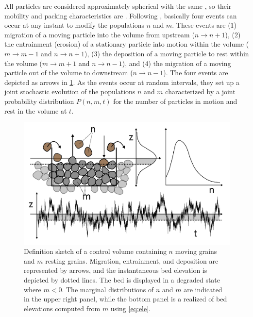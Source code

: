 All particles are considered approximately spherical with the same \DIFdelbegin {}\DIFdelend \DIFaddbegin {}\DIFaddend , so their mobility and packing characteristics are \DIFdelbegin {}\DIFdelend \DIFaddbegin {}\DIFaddend .
Following \citet{Ancey2008}, basically four events can occur at any instant to modify the populations $n$ and $m$.
These events are \DIFdelbegin {}\DIFdelend (1) migration of a moving particle into the volume from upstream ($n \rightarrow n+1$), (2) the entrainment (erosion) of a stationary particle into motion within the volume ($m\rightarrow m-1$ and $n\rightarrow n+1$), (3) the deposition of a moving particle to rest within the volume ($m\rightarrow m+1$ and $n\rightarrow n-1$), and (4) the migration of a moving particle out of the volume to downstream ($n\rightarrow n-1$).
The four events are depicted as arrows in \DIFdelbegin {}\DIFdelend \DIFaddbegin {}\DIFaddend \ref{fig:eledefinition}.
As the events occur at random intervals, they set up a joint stochastic evolution of the populations $n$ and $m$ characterized by a joint probability distribution $P(n,m,t)$ for the number of particles in motion and rest in the volume at $t$.
\begin{figure}[!htbp]
	\DIFdelbeginFL %
\DIFdelendFL \DIFaddbeginFL \includegraphics[width=\linewidth,keepaspectratio]{./figures/ch3/improveddef.png}
	\DIFaddendFL \caption{Definition sketch of a control volume containing $n$ moving grains and $m$ resting grains. Migration, entrainment, and deposition are represented by arrows, and the instantaneous bed elevation is depicted by dotted lines. The bed is displayed in a degraded state \DIFdelbeginFL \DIFdelFL{, }\DIFdelendFL where $m<0$. The marginal distributions of $n$ and $m$ are indicated in the upper right panel, while the bottom panel is a realized \DIFdelbeginFL {}\DIFdelendFL \DIFaddbeginFL {}\DIFaddendFL of bed elevations computed from $m$ using \DIFdelbeginFL \DIFdelFL{(}\DIFdelendFL \DIFaddbeginFL {}\DIFaddendFL \ref{eq:ele}\DIFdelbeginFL \DIFdelFL{)}\DIFdelendFL .}
	\label{fig:eledefinition}
\end{figure}

